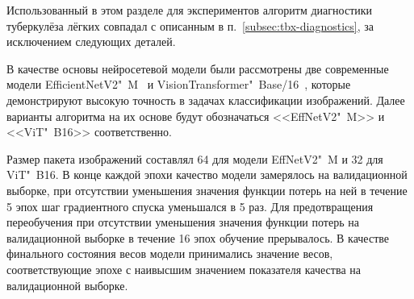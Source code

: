 Использованный в этом разделе для экспериментов алгоритм диагностики туберкулёза лёгких совпадал с описанным в п.~\ref{subsec:tbx-diagnostics}, за исключением следующих деталей.

В качестве основы нейросетевой модели были рассмотрены две современные модели EfficientNetV2"~M~\cite{tan2021efficientnetv2} и VisionTransformer"~Base/16~\cite{dosovitskiy2021an}, которые демонстрируют высокую точность в задачах классификации изображений. Далее варианты алгоритма на их основе будут обозначаться <<EffNetV2"~M>> и <<ViT"~B16>> соответственно. 

Размер пакета изображений составлял 64 для модели EffNetV2"~M и 32 для ViT"~B16. В конце каждой эпохи качество модели замерялось на валидационной выборке, при отсутствии уменьшения значения функции потерь на ней в течение 5 эпох шаг градиентного спуска уменьшался в 5 раз. Для предотвращения переобучения при отсутствии уменьшения значения функции потерь на валидационной выборке в течение 16 эпох обучение прерывалось. В качестве финального состояния весов модели принимались значение весов, соответствующие эпохе с наивысшим значением показателя качества на валидационной выборке. %

%
%
%

